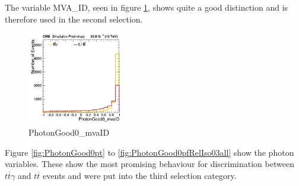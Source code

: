 \documentclass[11pt]{scrartcl}
\begin{document}
The variable MVA\_ID, seen in figure \ref{fig:PhotonGood0mvaID}, shows quite a good distinction and is therefore used in the second selection.

	\begin{figure}[H]
	\centering
	\includegraphics[width=0.38\textwidth]{figures/Select2/PhotonGood0_mvaID.png}
	\caption{PhotonGood0\_mvaID}
 	\label{fig:PhotonGood0mvaID}
	\end{figure}
	
Figure \ref{fig:PhotonGood0pt} to \ref{fig:PhotonGood0pfRelIso03all} show the photon variables. These show the most promising behaviour for discrimination between $t\overline{t}\gamma$ and $t\overline{t}$ events and were put into the third selection category.
\end{document}
